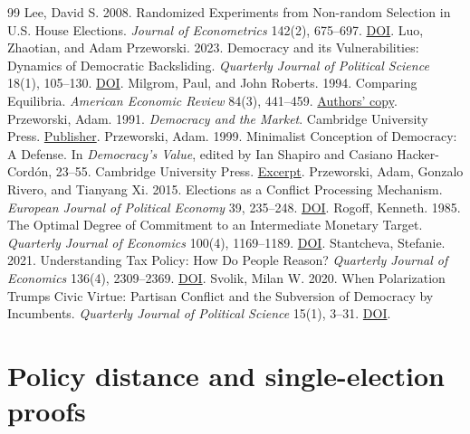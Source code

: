 \documentclass[11pt,letterpaper]{article}
\begin{document}
\begin{thebibliography}{99}
 Lee, David S. 2008. Randomized Experiments from Non-random Selection in U.S. House Elections. \emph{Journal of Econometrics} 142(2), 675--697. \href{https://doi.org/10.1016/j.jeconom.2007.05.004}{DOI}.
 Luo, Zhaotian, and Adam Przeworski. 2023. Democracy and its Vulnerabilities: Dynamics of Democratic Backsliding. \emph{Quarterly Journal of Political Science} 18(1), 105--130. \href{https://doi.org/10.1561/100.00021112}{DOI}.
 Milgrom, Paul, and John Roberts. 1994. Comparing Equilibria. \emph{American Economic Review} 84(3), 441--459. \href{https://web.stanford.edu/~milgrom/publishedarticles/Comparing\%20Equilibria.pdf}{Authors' copy}.
 Przeworski, Adam. 1991. \emph{Democracy and the Market}. Cambridge University Press. \href{https://www.cambridge.org/core/books/abs/democracy-and-the-market/democracy/0AA4BF19C5129B8634C501C22B5FB61B}{Publisher}.
 Przeworski, Adam. 1999. Minimalist Conception of Democracy: A Defense. In \emph{Democracy's Value}, edited by Ian Shapiro and Casiano Hacker-Cord\'on, 23--55. Cambridge University Press. \href{https://is.muni.cz/el/fss/podzim2016/POL401/um/Przeworski_Minimalist_Conception_of_Democracy.pdf}{Excerpt}.
 Przeworski, Adam, Gonzalo Rivero, and Tianyang Xi. 2015. Elections as a Conflict Processing Mechanism. \emph{European Journal of Political Economy} 39, 235--248. \href{https://doi.org/10.1016/j.ejpoleco.2015.05.006}{DOI}.
 Rogoff, Kenneth. 1985. The Optimal Degree of Commitment to an Intermediate Monetary Target. \emph{Quarterly Journal of Economics} 100(4), 1169--1189. \href{https://doi.org/10.2307/1885679}{DOI}.
 Stantcheva, Stefanie. 2021. Understanding Tax Policy: How Do People Reason? \emph{Quarterly Journal of Economics} 136(4), 2309--2369. \href{https://doi.org/10.1093/qje/qjab033}{DOI}.
 Svolik, Milan W. 2020. When Polarization Trumps Civic Virtue: Partisan Conflict and the Subversion of Democracy by Incumbents. \emph{Quarterly Journal of Political Science} 15(1), 3--31. \href{https://doi.org/10.1561/100.00018132}{DOI}.
\end{thebibliography}

\clearpage
\appendix
\linespread{1.045}\selectfont

\section{Policy distance and single-election proofs}\label{app:one}
\end{document}
